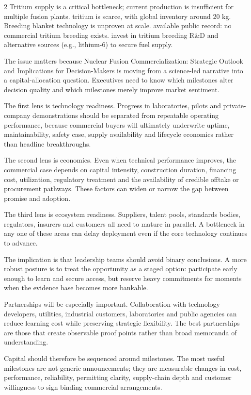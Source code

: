 \documentclass[10pt,a4paper]{article}
\begin{document}
\begin{multicols}{2}
{\small Tritium supply is a critical bottleneck; current production is insufficient for multiple fusion plants. tritium is scarce, with global inventory around 20 kg. Breeding blanket technology is unproven at scale. available public record: no commercial tritium breeding exists. invest in tritium breeding R\&D and alternative sources (e.g., lithium-6) to secure fuel supply.}\par
{\small The issue matters because Nuclear Fusion Commercialization: Strategic Outlook and Implications for Decision-Makers is moving from a science-led narrative into a capital-allocation question. Executives need to know which milestones alter decision quality and which milestones merely improve market sentiment.}\par
{\small The first lens is technology readiness. Progress in laboratories, pilots and private-company demonstrations should be separated from repeatable operating performance, because commercial buyers will ultimately underwrite uptime, maintainability, safety case, supply availability and lifecycle economics rather than headline breakthroughs.}\par
{\small The second lens is economics. Even when technical performance improves, the commercial case depends on capital intensity, construction duration, financing cost, utilization, regulatory treatment and the availability of credible offtake or procurement pathways. These factors can widen or narrow the gap between promise and adoption.}\par
{\small The third lens is ecosystem readiness. Suppliers, talent pools, standards bodies, regulators, insurers and customers all need to mature in parallel. A bottleneck in any one of these areas can delay deployment even if the core technology continues to advance.}\par
{\small The implication is that leadership teams should avoid binary conclusions. A more robust posture is to treat the opportunity as a staged option: participate early enough to learn and secure access, but reserve heavy commitments for moments when the evidence base becomes more bankable.}\par
{\small Partnerships will be especially important. Collaboration with technology developers, utilities, industrial customers, laboratories and public agencies can reduce learning cost while preserving strategic flexibility. The best partnerships are those that create observable proof points rather than broad memoranda of understanding.}\par
{\small Capital should therefore be sequenced around milestones. The most useful milestones are not generic announcements; they are measurable changes in cost, performance, reliability, permitting clarity, supply-chain depth and customer willingness to sign binding commercial arrangements.}\par
\end{multicols}
\end{document}
